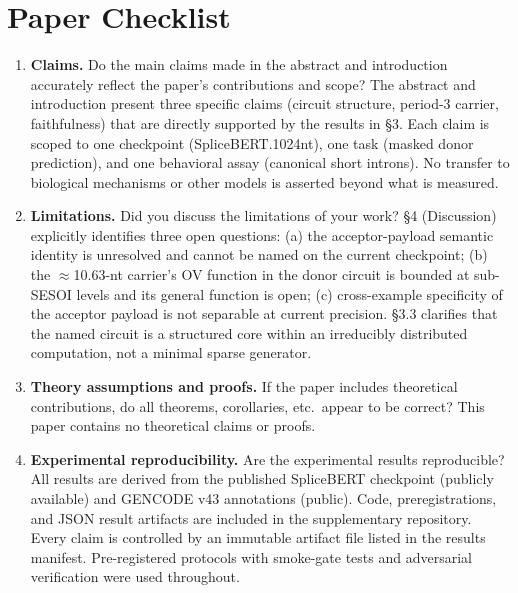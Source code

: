 
\section*{Paper Checklist}

\begin{enumerate}

\item \textbf{Claims.}
Do the main claims made in the abstract and introduction accurately reflect the paper's contributions and scope?
\answerYes{} The abstract and introduction present three specific claims (circuit structure, period-3 carrier, faithfulness) that are directly supported by the results in §3. Each claim is scoped to one checkpoint (SpliceBERT.1024nt), one task (masked donor prediction), and one behavioral assay (canonical short introns). No transfer to biological mechanisms or other models is asserted beyond what is measured.

\item \textbf{Limitations.}
Did you discuss the limitations of your work?
\answerYes{} §4 (Discussion) explicitly identifies three open questions: (a) the acceptor-payload semantic identity is unresolved and cannot be named on the current checkpoint; (b) the $\approx$10.63-nt carrier's OV function in the donor circuit is bounded at sub-SESOI levels and its general function is open; (c) cross-example specificity of the acceptor payload is not separable at current precision. §3.3 clarifies that the named circuit is a structured core within an irreducibly distributed computation, not a minimal sparse generator.

\item \textbf{Theory assumptions and proofs.}
If the paper includes theoretical contributions, do all theorems, corollaries, etc.\ appear to be correct?
\answerNA{} This paper contains no theoretical claims or proofs.

\item \textbf{Experimental reproducibility.}
Are the experimental results reproducible?
\answerYes{} All results are derived from the published SpliceBERT checkpoint (publicly available) and GENCODE v43 annotations (public). Code, preregistrations, and JSON result artifacts are included in the supplementary repository. Every claim is controlled by an immutable artifact file listed in the results manifest. Pre-registered protocols with smoke-gate tests and adversarial verification were used throughout.


\end{enumerate}
